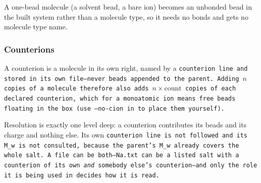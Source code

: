 A one-bead molecule (a solvent bead, a bare ion) becomes an unbonded bead in
the built system rather than a molecule type, so it needs no bonds and gets no
molecule type name.

\subsubsection*{Counterions}

A counterion is a molecule in its own right, named by a \tt{counterion} line
and stored in its own file---never beads appended to the parent. Adding $n$
copies of a molecule therefore also adds $n \times \text{count}$ copies of each
declared counterion, which for a monoatomic ion means free beads floating in
the box (use \tt{--no-cion} in  to place them
yourself).

Resolution is exactly one level deep: a counterion contributes its beads and
its charge and nothing else. Its own \tt{counterion} line is not followed and
its \tt{M_w} is not consulted, because the parent's \tt{M_w} already covers the
whole salt. A file can be both---\tt{Na.txt} can be a listed salt with a
counterion of its own \emph{and} somebody else's counterion---and only the role
it is being used in decides how it is read. %

